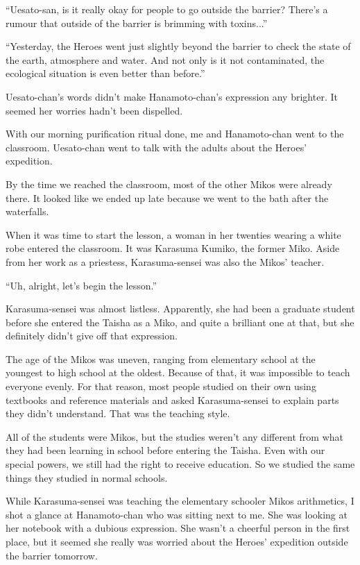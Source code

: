 ``Uesato-san, is it really okay for people to go outside the barrier? There's a rumour that outside of the barrier is brimming with toxins...''

``Yesterday, the Heroes went just slightly beyond the barrier to check the state of the earth, atmosphere and water. And not only is it not contaminated, the ecological situation is even better than before.''

Uesato-chan's words didn't make Hanamoto-chan's expression any brighter. It seemed her worries hadn't been dispelled.

With our morning purification ritual done, me and Hanamoto-chan went to the classroom. Uesato-chan went to talk with the adults about the Heroes' expedition.

By the time we reached the classroom, most of the other Mikos were already there. It looked like we ended up late because we went to the bath after the waterfalls.

When it was time to start the lesson, a woman in her twenties wearing a white robe entered the classroom. It was Karasuma Kumiko, the former Miko. Aside from her work as a priestess, Karasuma-sensei was also the Mikos' teacher.

``Uh, alright, let's begin the lesson.''

Karasuma-sensei was almost listless. Apparently, she had been a graduate student before she entered the Taisha as a Miko, and quite a brilliant one at that, but she definitely didn't give off that expression.

The age of the Mikos was uneven, ranging from elementary school at the youngest to high school at the oldest. Because of that, it was impossible to teach everyone evenly. For that reason, most people studied on their own using textbooks and reference materials and asked Karasuma-sensei to explain parts they didn't understand. That was the teaching style.

All of the students were Mikos, but the studies weren't any different from what they had been learning in school before entering the Taisha. Even with our special powers, we still had the right to receive education. So we studied the same things they studied in normal schools.

While Karasuma-sensei was teaching the elementary schooler Mikos arithmetics, I shot a glance at Hanamoto-chan who was sitting next to me. She was looking at her notebook with a dubious expression. She wasn't a cheerful person in the first place, but it seemed she really was worried about the Heroes' expedition outside the barrier tomorrow.

